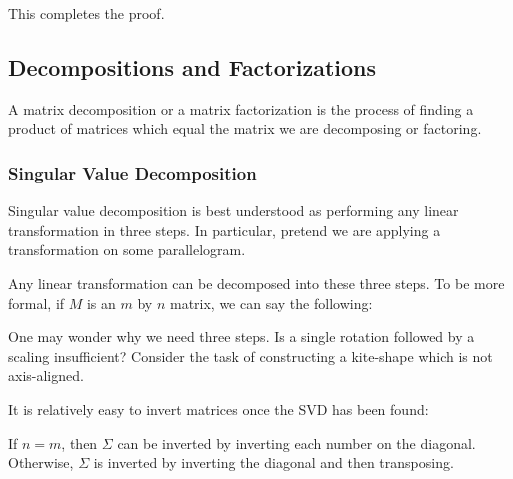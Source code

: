 \documentclass[12pt]{article}
\begin{document}
This completes the proof.

\subsection{Decompositions and Factorizations}

A matrix decomposition or a matrix factorization is the process of finding a product of matrices which equal the matrix we are decomposing or factoring.

\subsubsection{Singular Value Decomposition}


Singular value decomposition is best understood as performing any linear transformation in three steps. In particular, pretend we are applying a transformation on some parallelogram.


Any linear transformation can be decomposed into these three steps. To be more formal, if $M$ is an $m$ by $n$ matrix, we can say the following:


One may wonder why we need three steps. Is a single rotation followed by a scaling insufficient? Consider the task of constructing a kite-shape which is not axis-aligned.

It is relatively easy to invert matrices once the SVD has been found:


If $n = m$, then $\Sigma$ can be inverted by inverting each number on the diagonal. Otherwise, $\Sigma$ is inverted by inverting the diagonal and then transposing.
\end{document}
